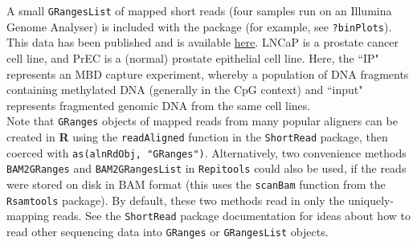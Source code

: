 A small \texttt{GRangesList} of mapped short reads (four samples run on an Illumina Genome Analyser) is included with the package (for example, see \texttt{?binPlots}). This data has been published and is available \href{http://www.ncbi.nlm.nih.gov/geo/query/acc.cgi?acc=GSE24546}{here}. LNCaP is a prostate cancer cell line, and PrEC is a (normal) prostate epithelial cell line.  Here, the ``IP" represents an MBD capture experiment, whereby a population of DNA fragments containing methylated DNA (generally in the CpG context) and ``input" represents fragmented genomic DNA from the same cell lines. \\

Note that \texttt{GRanges} objects of mapped reads from many popular aligners can be created in \textbf{R} using the \texttt{readAligned} function in the \texttt{ShortRead} package, then coerced with \texttt{as(alnRdObj, "GRanges")}. Alternatively, two convenience methods \texttt{BAM2GRanges} and \texttt{BAM2GRangesList} in \texttt{Repitools} could also be used, if the reads were stored on disk in BAM format (this uses the \texttt{scanBam} function from the \texttt{Rsamtools} package). By default, these two methods read in only the uniquely-mapping reads. See the \texttt{ShortRead} package documentation for ideas about how to read other sequencing data into \texttt{GRanges} or \texttt{GRangesList} objects.

